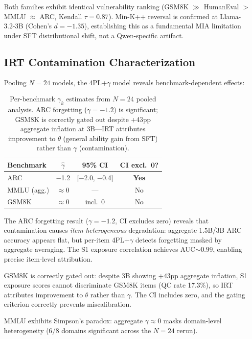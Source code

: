 \documentclass[11pt,a4paper]{article}
\newcommand{\gam}{\gamma}
\newcommand{\thet}{\theta}
\begin{document}
Both families exhibit identical vulnerability ranking (GSM8K $\gg$ HumanEval $>$ MMLU $\approx$ ARC, Kendall $\tau{=}0.87$). Min-K++ reversal is confirmed at Llama-3.2-3B (Cohen's $d{=}{-}1.35$), establishing this as a fundamental MIA limitation under SFT distributional shift, not a Qwen-specific artifact.

\subsection{IRT Contamination Characterization}
\label{sec:irt}

Pooling $N{=}24$ models, the 4PL+$\gam$ model reveals benchmark-dependent effects:

\begin{table}[t]
\centering
\small
\begin{tabular}{lccc}
\toprule
\textbf{Benchmark} & $\hat{\gam}$ & \textbf{95\% CI} & \textbf{CI excl.\ 0?} \\
\midrule
ARC & $-$1.2 & [$-$2.0, $-$0.4] & \textbf{Yes} \\
MMLU (agg.) & $\approx$0 & --- & No \\
GSM8K & $\approx$0 & incl.\ 0 & No \\
\bottomrule
\end{tabular}
\caption{Per-benchmark $\gam_k$ estimates from $N{=}24$ pooled analysis. ARC forgetting ($\gam{=}{-}1.2$) is significant; GSM8K is correctly gated out despite +43pp aggregate inflation at 3B---IRT attributes improvement to $\thet$ (general ability gain from SFT) rather than $\gam$ (contamination).}
\label{tab:gamma}
\end{table}

The ARC forgetting result ($\gam{=}{-}1.2$, CI excludes zero) reveals that contamination causes \emph{item-heterogeneous} degradation: aggregate 1.5B/3B ARC accuracy appears flat, but per-item 4PL+$\gam$ detects forgetting masked by aggregate averaging. The S1 exposure correlation achieves AUC${\sim}0.99$, enabling precise item-level attribution.

GSM8K is correctly gated out: despite 3B showing +43pp aggregate inflation, S1 exposure scores cannot discriminate GSM8K items (QC rate 17.3\%), so IRT attributes improvement to $\thet$ rather than $\gam$. The CI includes zero, and the gating criterion correctly prevents miscalibration.

MMLU exhibits Simpson's paradox: aggregate $\gam{\approx}0$ masks domain-level heterogeneity (6/8 domains significant across the $N{=}24$ rerun).
\end{document}

